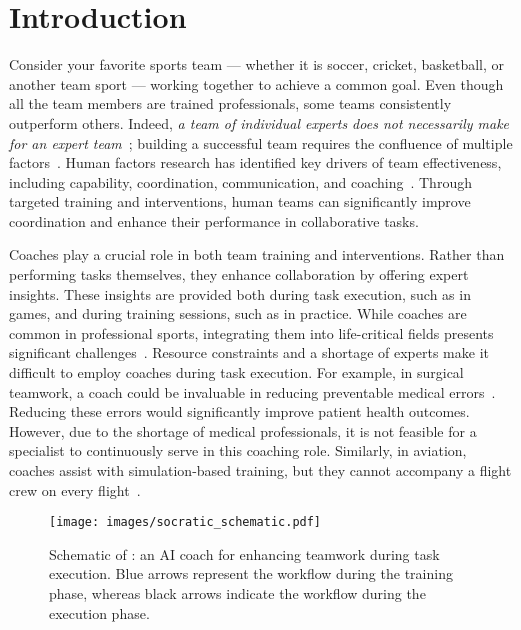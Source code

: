 \section{Introduction}
\label{sec. intro}
Consider your favorite sports team --- whether it is soccer, cricket, basketball, or another team sport --- working together to achieve a common goal. Even though all the team members are trained professionals, some teams consistently outperform others. Indeed, \textit{a team of individual experts does not necessarily make for an expert team}~\cite{bisbey2021transforming}; building a successful team requires the confluence of multiple factors~\cite{mathieu2000influence}. Human factors research has identified key drivers of team effectiveness, including capability, coordination, communication, and coaching~\cite{tannenbaum2020teams}. Through targeted training and interventions, human teams can significantly improve coordination and enhance their performance in collaborative tasks.
\ifarxiv
{}
\else
{}
\fi

Coaches play a crucial role in both team training and interventions. Rather than performing tasks themselves, they enhance collaboration by offering expert insights. These insights are provided both during task execution, such as in games, and during training sessions, such as in practice. While coaches are common in professional sports, integrating them into life-critical fields presents significant challenges~\cite{seo2021towards, orlov2024rw4t}. Resource constraints and a shortage of experts make it difficult to employ coaches during task execution.
For example, in surgical teamwork, a coach could be invaluable in reducing preventable medical errors~\cite{wahr2013patient, makary2016medical, seo2021towards}. Reducing these errors would significantly improve patient health outcomes. However, due to the shortage of medical professionals, it is not feasible for a specialist to continuously serve in this coaching role. Similarly, in aviation, coaches assist with simulation-based training, but they cannot accompany a flight crew on every flight~\cite{kolander2019flight}. 

\begin{figure*}[t]
  \centering
  \texttt{[image: images/socratic\_schematic.pdf]}
  \caption{Schematic of \coach: an AI coach for enhancing teamwork during task execution. Blue arrows represent the workflow during the training phase, whereas black arrows indicate the workflow during the execution phase.} 
  \label{fig. schematic} 
\end{figure*}

